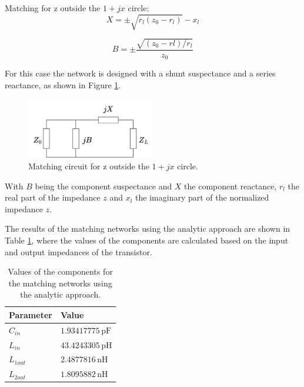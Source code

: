 Matching for z outside the $1+jx$ circle:
\begin{equation}
    X = \pm \sqrt{r_l(z_0-r_l)}-x_l
\end{equation}

\begin{equation}
    B = \pm \frac{\sqrt{(z_0-rl)/r_l}}{z_0}
\end{equation}

For this case the network is designed with a shunt suspectance and a series reactance, as shown in Figure \ref{fig:outside-matching}.
\begin{figure}[H]
    \centering
    \includegraphics[width=0.5\textwidth]{Images/inside-matching.png}
    \caption{Matching circuit for z outside the $1+jx$ circle.}
    \label{fig:outside-matching}
\end{figure}

With $B$ being the component suspectance and $X$ the component reactance, $r_l$ the real part of the impedance $z$ and $x_l$ the imaginary part of the  normalized impedance $z$.

The results of the matching networks using the analytic approach are shown in Table \ref{tab:MatchingValues}, where the values of the components are calculated based on the input and output impedances of the transistor.

\begin{table}[H]
    \centering
    \caption{Values of the components for the matching networks using the analytic approach.}
    \begin{tabularx}{\textwidth}{>{\centering\arraybackslash}X >{\centering\arraybackslash}X}
        \toprule
        \textbf{Parameter} & \textbf{Value} \\
        \midrule
        $C_{in}$     & $1.93417775\,\si{\pico\farad}$ \\
        \midrule
        $L_{in}$     & $43.4243305\,\si{\pico\henry}$\\
        \midrule
        $L_{1out}$   & $2.4877816\,\si{\nano\henry}$ \\
        \midrule
        $L_{2out}$   & $1.8095882\,\si{\nano\henry}$\\
        \bottomrule
    \end{tabularx}
    \label{tab:MatchingValues}
\end{table}

